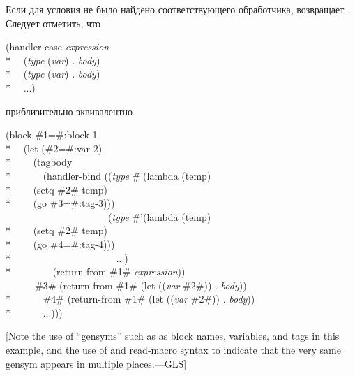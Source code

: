 \begin{defmac}
Если для условия не было найдено соответствующего обработчика,
 возвращает . Следует отметить, что 
\begin{lisp}
(handler-case \emph{expression} \\*
~~(\emph{type} (\emph{var}) . \emph{body}) \\*
~~(\emph{type} (\emph{var}) . \emph{body}) \\*
~~...)
\end{lisp}
приблизительно эквивалентно
\begin{lisp}
(block \#1=\#:block-1 \\*
~~(let (\#2=\#:var-2) \\*
~~~~(tagbody \\*
~~~~~~(handler-bind ((\emph{type} \=\#'(lambda (temp) \\*
\>~~~~(setq \#2\# temp) \\*
\>~~~~(go \#3=\#:tag-3))) \\
~~~~~~~~~~~~~~~~~~~~~(\emph{type} \=\#'(lambda (temp) \\*
\>~~~~(setq \#2\# temp) \\*
\>~~~~(go \#4=\#:tag-4))) \\*
~~~~~~~~~~~~~~~~~~~~~...) \\*
~~~~~~~~(return-from \#1\# \emph{expression})) \\
~~~~~~\#3\# (return-from \#1\# (let ((\emph{var} \#2\#)) . \emph{body})) \\*
~~~~~~\#4\# (return-from \#1\# (let ((\emph{var} \#2\#)) . \emph{body})) \\*
~~~~~~...)))
\end{lisp}
[Note the use of ``gensyms'' such as 
as block names, variables, and  tags in this example,
and the use of  and  read-macro syntax
to indicate that the very same gensym appears in multiple places.---GLS]


\end{defmac}
